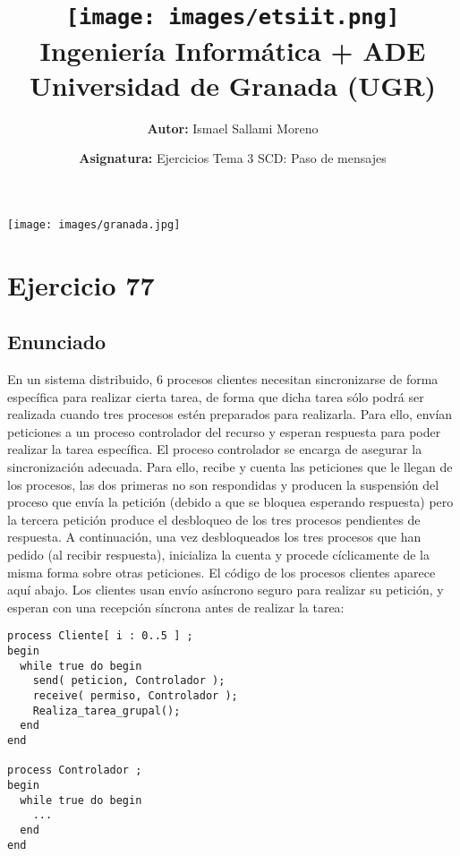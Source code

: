 \documentclass[a4paper,12pt]{article}
\title{
    \vspace{-2cm}
    \texttt{[image: images/etsiit.png]} \\ %
    \LARGE Ingeniería Informática + ADE\\
    \large Universidad de Granada (UGR)\\[1cm]
}
\author{\textbf{Autor:} Ismael Sallami Moreno}
\date{\textbf{Asignatura:} Ejercicios Tema 3 SCD: Paso de mensajes}
\begin{document}
\maketitle
\thispagestyle{empty}

\begin{center}
    \texttt{[image: images/granada.jpg]} \\ %
    \vfill
\end{center}

\newpage

\tableofcontents
\newpage
\section{Ejercicio 77}

\subsection{Enunciado}
En un sistema distribuido, 6 procesos clientes necesitan sincronizarse de forma específica para
realizar cierta tarea, de forma que dicha tarea sólo podrá ser realizada cuando tres procesos estén
preparados para realizarla. Para ello, envían peticiones a un proceso controlador del recurso y
esperan respuesta para poder realizar la tarea específica. El proceso controlador se encarga
de asegurar la sincronización adecuada. Para ello, recibe y cuenta las peticiones que le llegan
de los procesos, las dos primeras no son respondidas y producen la suspensión del proceso
que envía la petición (debido a que se bloquea esperando respuesta) pero la tercera petición
produce el desbloqueo de los tres procesos pendientes de respuesta. A continuación, una vez
desbloqueados los tres procesos que han pedido (al recibir respuesta), inicializa la cuenta y
procede cíclicamente de la misma forma sobre otras peticiones. El código de los procesos
clientes aparece aquí abajo. Los clientes usan envío asíncrono seguro para realizar su petición,
y esperan con una recepción síncrona antes de realizar la tarea:

\begin{lstlisting}[style=customcpp]
process Cliente[ i : 0..5 ] ;
begin
  while true do begin
    send( peticion, Controlador );
    receive( permiso, Controlador );
    Realiza_tarea_grupal();
  end
end

process Controlador ;
begin
  while true do begin
    ...
  end
end
\end{lstlisting}
\end{document}
